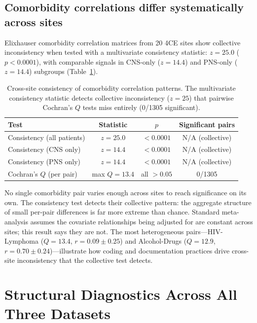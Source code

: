 \documentclass[11pt]{article}
\begin{document}
\subsection{Comorbidity correlations differ systematically across sites}

Elixhauser comorbidity correlation matrices \cite{elixhauser1998} from 20
4CE sites show collective inconsistency when tested with a multivariate
consistency statistic: $z = 25.0$ ($p < 0.0001$), with comparable signals
in CNS-only ($z = 14.4$) and PNS-only ($z = 14.4$) subgroups
(Table~\ref{tab:consistency}).

\begin{table}[t]
\centering
\caption{Cross-site consistency of comorbidity correlation patterns.  The
multivariate consistency statistic detects collective inconsistency
($z = 25$) that pairwise Cochran's $Q$ tests miss entirely (0/1305
significant).}
\label{tab:consistency}
\begin{tabular}{lccc}
\toprule
Test & Statistic & $p$ & Significant pairs \\
\midrule
Consistency (all patients) & $z = 25.0$ & $< 0.0001$ & N/A (collective) \\
Consistency (CNS only) & $z = 14.4$ & $< 0.0001$ & N/A (collective) \\
Consistency (PNS only) & $z = 14.4$ & $< 0.0001$ & N/A (collective) \\
Cochran's $Q$ (per pair) & max $Q = 13.4$ & all $> 0.05$ & 0/1305 \\
\bottomrule
\end{tabular}
\end{table}

No single comorbidity pair varies enough across sites to reach significance
on its own.  The consistency test detects their collective pattern: the
aggregate structure of small per-pair differences is far more extreme than
chance.  Standard meta-analysis assumes the covariate relationships being
adjusted for are constant across sites; this result says they are not.  The most
heterogeneous pairs---HIV-Lymphoma ($Q = 13.4$, $r = 0.09 \pm 0.25$) and
Alcohol-Drugs ($Q = 12.9$, $r = 0.70 \pm 0.24$)---illustrate how coding
and documentation practices drive cross-site inconsistency that the
collective test detects.


\section{Structural Diagnostics Across All Three Datasets}
\end{document}

